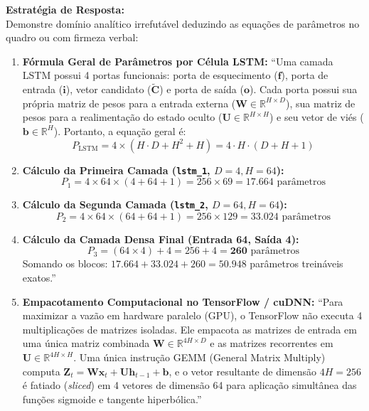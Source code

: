 \documentclass[11pt,a4paper]{article}
\begin{document}
\begin{boardAnswer}
\textbf{Estratégia de Resposta:}\\
Demonstre domínio analítico irrefutável deduzindo as equações de parâmetros no quadro ou com firmeza verbal:

\begin{enumerate}[leftmargin=0.8cm]
  \item \textbf{Fórmula Geral de Parâmetros por Célula LSTM:} ``Uma camada LSTM possui 4 portas funcionais: porta de esquecimento ($\mathbf{f}$), porta de entrada ($\mathbf{i}$), vetor candidato ($\tilde{\mathbf{C}}$) e porta de saída ($\mathbf{o}$). Cada porta possui sua própria matriz de pesos para a entrada externa ($\mathbf{W} \in \mathbb{R}^{H \times D}$), sua matriz de pesos para a realimentação do estado oculto ($\mathbf{U} \in \mathbb{R}^{H \times H}$) e seu vetor de viés ($\mathbf{b} \in \mathbb{R}^H$). Portanto, a equação geral é:
  \begin{equation}
    P_{\text{LSTM}} = 4 \times \left( H \cdot D + H^2 + H \right) = 4 \cdot H \cdot (D + H + 1)
  \end{equation}
  \item \textbf{Cálculo da Primeira Camada (\texttt{lstm\_1}, $D=4, H=64$):}
  \begin{equation}
    P_1 = 4 \times 64 \times (4 + 64 + 1) = 256 \times 69 = \mathbf{17.664} \text{ parâmetros}
  \end{equation}
  \item \textbf{Cálculo da Segunda Camada (\texttt{lstm\_2}, $D=64, H=64$):}
  \begin{equation}
    P_2 = 4 \times 64 \times (64 + 64 + 1) = 256 \times 129 = \mathbf{33.024} \text{ parâmetros}
  \end{equation}
  \item \textbf{Cálculo da Camada Densa Final (Entrada 64, Saída 4):}
  \begin{equation}
    P_3 = (64 \times 4) + 4 = 256 + 4 = \mathbf{260} \text{ parâmetros}
  \end{equation}
  Somando os blocos: $17.664 + 33.024 + 260 = \mathbf{50.948}$ parâmetros treináveis exatos.''
  \item \textbf{Empacotamento Computacional no TensorFlow / cuDNN:} ``Para maximizar a vazão em hardware paralelo (GPU), o TensorFlow não executa 4 multiplicações de matrizes isoladas. Ele empacota as matrizes de entrada em uma única matriz combinada $\mathbf{W} \in \mathbb{R}^{4H \times D}$ e as matrizes recorrentes em $\mathbf{U} \in \mathbb{R}^{4H \times H}$. Uma única instrução GEMM (General Matrix Multiply) computa $\mathbf{Z}_t = \mathbf{W}\mathbf{x}_t + \mathbf{U}\mathbf{h}_{t-1} + \mathbf{b}$, e o vetor resultante de dimensão $4H = 256$ é fatiado (\textit{sliced}) em 4 vetores de dimensão 64 para aplicação simultânea das funções sigmoide e tangente hiperbólica.''
\end{enumerate}
\end{boardAnswer}
\end{document}

